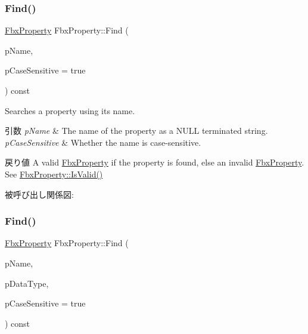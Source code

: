 \subsubsection{\texorpdfstring{Find()}{Find()}\hspace{0.1cm}{\footnotesize\ttfamily [1/2]}}
{\footnotesize\ttfamily \hyperlink{class_fbx_property}{Fbx\+Property} Fbx\+Property\+::\+Find (\begin{DoxyParamCaption}\item[{const char $\ast$}]{p\+Name,  }\item[{bool}]{p\+Case\+Sensitive = {\ttfamily true} }\end{DoxyParamCaption}) const}

Searches a property using its name. 
\begin{DoxyParams}{引数}
{\em p\+Name} & The name of the property as a {\ttfamily N\+U\+LL} terminated string. \\
\hline
{\em p\+Case\+Sensitive} & Whether the name is case-\/sensitive. \\
\hline
\end{DoxyParams}
\begin{DoxyReturn}{戻り値}
A valid \hyperlink{class_fbx_property}{Fbx\+Property} if the property is found, else an invalid \hyperlink{class_fbx_property}{Fbx\+Property}. See \hyperlink{class_fbx_property_a1c40042c55d1f4a1d4837f06fbc1d764}{Fbx\+Property\+::\+Is\+Valid()} 
\end{DoxyReturn}
被呼び出し関係図\+:
\mbox{\label{class_fbx_property_acd7815414a490b7d6c2fb6bf1d95536e}} 
\subsubsection{\texorpdfstring{Find()}{Find()}\hspace{0.1cm}{\footnotesize\ttfamily [2/2]}}
{\footnotesize\ttfamily \hyperlink{class_fbx_property}{Fbx\+Property} Fbx\+Property\+::\+Find (\begin{DoxyParamCaption}\item[{const char $\ast$}]{p\+Name,  }\item[{const \hyperlink{class_fbx_data_type}{Fbx\+Data\+Type} \&}]{p\+Data\+Type,  }\item[{bool}]{p\+Case\+Sensitive = {\ttfamily true} }\end{DoxyParamCaption}) const}

